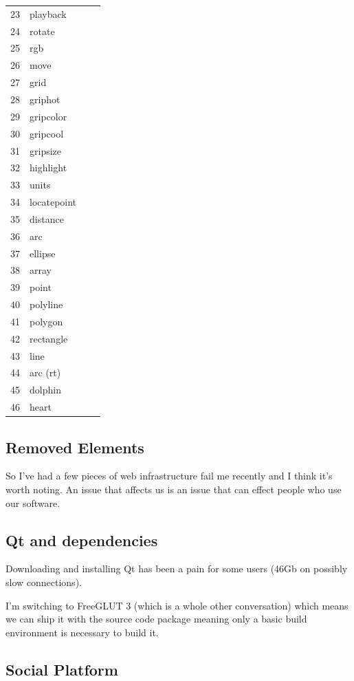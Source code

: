\documentclass{report}
\begin{document}
\begin{longtable}{l l l p{3.5cm}}
23 & \index{playback}playback & & \\
24 & \index{rotate}rotate & & \\
25 & rgb & & \\
26 & move & & \\
27 & grid & & \\
28 & griphot &  &  \\
29 & gripcolor & & \\
30 & gripcool &  &  \\
31 & gripsize &  &  \\
32 & highlight &  &  \\
33 & units &  &  \\
34 & locatepoint &  &  \\
35 & distance &  &  \\
36 & arc &  &  \\
37 & ellipse &  &  \\
38 & array &  &  \\
39 & point &  &  \\
40 & polyline &  &  \\
41 & polygon &  &  \\
42 & rectangle &  &  \\
43 & line &  &  \\
44 & arc (rt) &  &  \\
45 & dolphin &  &  \\
46 & heart  & &
\end{longtable}

\subsection{Removed Elements}

So I've had a few pieces of web infrastructure fail me recently and
I think it's worth noting. An issue that affects us is an issue that
can effect people who use our software.

\subsection{Qt and dependencies}

Downloading and installing Qt has been a pain for some users
(46Gb on possibly slow connections).

I'm switching to FreeGLUT 3 (which is a whole other conversation) which means we
can ship it with the source code package meaning only a basic build
environment is necessary to build it.

\subsection{Social Platform}
\end{document}
